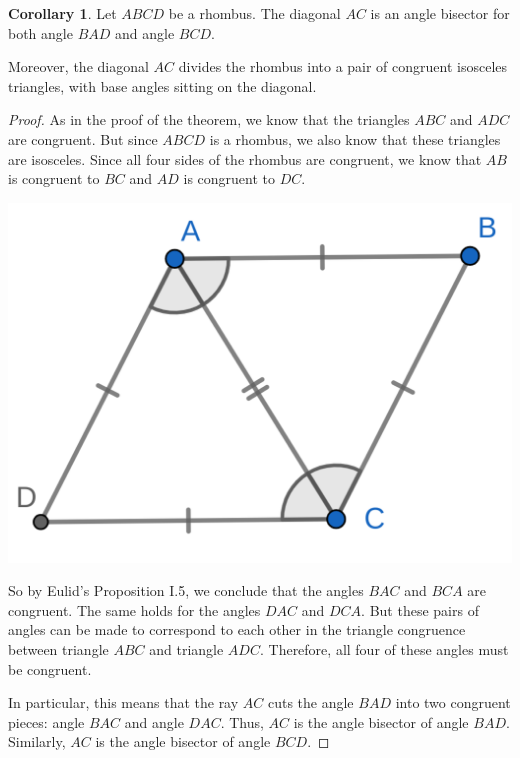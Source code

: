 \documentclass{tufte-handout}
\theoremstyle{definition}
\newtheorem{corollary}[theorem]{Corollary}
\begin{document}
\begin{corollary}\label{corollary:rhombus-angle-bisectors}
Let $ABCD$ be a rhombus. The diagonal $AC$ is an angle bisector for both angle $BAD$ and angle $BCD$.

Moreover, the diagonal $AC$ divides the rhombus into a pair of congruent isosceles triangles, with base angles sitting on the diagonal.
\end{corollary}

\begin{proof}
As in the proof of the theorem, we know that the triangles $ABC$ and $ADC$ are congruent. But since $ABCD$ is a rhombus, we also know that these triangles are isosceles. Since all four sides of the rhombus are congruent, we know that $AB$ is congruent to $BC$ and $AD$ is congruent to $DC$.

\begin{marginfigure}
  \includegraphics{images/rhombus_diagonal_marked.png}
\end{marginfigure}

So by Eulid's Proposition I.5, we conclude that the angles
$BAC$ and $BCA$ are congruent. The same holds for the angles $DAC$ and $DCA$. But these pairs of angles can be made to correspond to each other in the triangle congruence between triangle $ABC$ and triangle $ADC$. Therefore, all four of these angles must be congruent.

In particular, this means that the ray $AC$ cuts the angle $BAD$ into two congruent pieces: angle $BAC$ and angle $DAC$. Thus, $AC$ is the angle bisector of angle $BAD$. Similarly, $AC$ is the angle bisector of angle $BCD$.
\end{proof}
\end{document}
